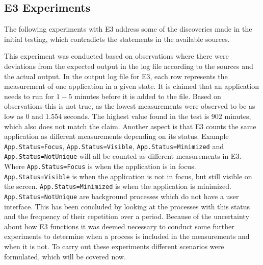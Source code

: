 \subsection{E3 Experiments}\label{sec:E3Experiments}

The following experiments with E3 address some of the discoveries made in the initial testing, which contradicts the statements in the available sources\cite[]{E3Doc,E3Video,E3WinHec}. 

This experiment was conducted based on observations where there were deviations from the expected output in the log file according to the sources and the actual output. In the output log file for E3, each row represents the measurement of one application in a given state. It is claimed that an application needs to run for $1-5$ minutes before it is added to the file. Based on observations this is not true, as the lowest measurements were observed to be as low as  $0$ and $1.554$ seconds. The highest value found in the test is $902$ minutes, which also does not match the claim. Another aspect is that E3 counts the same application as different measurements depending on its status.
Example \texttt{App.Status=Focus}, \texttt{App.Status=Visible}, \texttt{App.Status=Minimized} and \texttt{App.Status=NotUnique} will all be counted as different measurements in E3. Where \texttt{App.Status=Focus} is when the application is in focus. \texttt{App.Status=Visible} is when the application is not in focus, but still visible on the screen. \texttt{App.Status=Minimized} is when the application is minimized. \texttt{App.Status=NotUnique} are background processes which do not have a user interface. This has been concluded by looking at the processes with this status and the frequency of their repetition over a period. 
Because of the uncertainty about how E3 functions it was deemed necessary to conduct some further experiments to determine when a process is included in the measurements and when it is not. To carry out these experiments different scenarios were formulated, which will be covered now.

